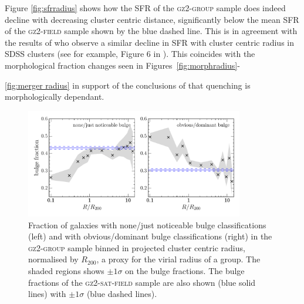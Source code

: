 \documentclass[useAMS,usenatbib]{mn2e}
\begin{document}
Figure \ref{fig:sfrradius} shows how the SFR of the \textsc{gz2-group} sample does indeed decline with decreasing cluster centric distance, significantly below the mean SFR of the \textsc{gz2-field} sample shown by the blue dashed line. This is in agreement with the results of \cite{gomez03} who observe a similar decline in SFR with cluster centric radius in SDSS clusters (see for example, Figure 6 in \citealt{gomez03}). This coincides with the morphological fraction changes seen in Figures~\ref{fig:morphradius}-{\ref{fig:merger radius} in support of the conclusions of \citet{smethurst15} that quenching is morphologically dependant. 

\begin{figure}
\includegraphics[width=0.85\textwidth]{min_max_bulge_fraction_trend_with_log_radius_sat_field_cand.pdf}
\caption{Fraction of galaxies with none/just noticeable bulge classifications (left) and with obvious/dominant bulge classifications (right) in the \textsc{gz2-group} sample binned in projected cluster centric radius, normalised by $R_{200}$, a proxy for the virial radius of a group. The shaded regions shows $\pm1\sigma$ on the bulge fractions. The bulge fractions of the \textsc{gz2-sat-field} sample are also shown (blue solid lines) with $\pm1\sigma$ (blue dashed lines).}
\label{fig:bulgeradius}
\end{figure}

}
\end{document}
